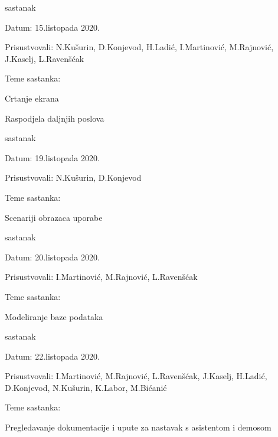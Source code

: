 \begin{packed_enum}
	\item sastanak
	\item[] \begin{packed_item}
		\item Datum: 15.listopada 2020.
		\item Prisustvovali: N.Kušurin, D.Konjevod, H.Ladić, I.Martinović, M.Rajnović, J.Kaselj, L.Ravenšćak
		\item Teme sastanka: 
		\begin{packed_item}
			\item   Crtanje ekrana
			\item 	Raspodjela daljnjih poslova
		\end{packed_item}
	\end{packed_item}

	\item sastanak
	\item[] \begin{packed_item}
		\item Datum:  19.listopada 2020.
		\item Prisustvovali: N.Kušurin, D.Konjevod
		\item Teme sastanka: 
		\begin{packed_item}
			\item   Scenariji obrazaca uporabe
		\end{packed_item}
	\end{packed_item}
	
	
	\item sastanak
	\item[] \begin{packed_item}
		\item Datum: 20.listopada 2020.
		\item Prisustvovali: I.Martinović, M.Rajnović, L.Ravenšćak
		\item Teme sastanka: 
		\begin{packed_item}
			\item   Modeliranje baze podataka
		\end{packed_item}
	\end{packed_item}
			
			
			\item sastanak
			\item[] \begin{packed_item}
				\item Datum: 22.listopada 2020.
				\item Prisustvovali: I.Martinović, M.Rajnović, L.Ravenšćak, J.Kaselj, H.Ladić, D.Konjevod, N.Kušurin, K.Labor, M.Bićanić
				\item Teme sastanka: 
				\begin{packed_item}
					\item   Pregledavanje dokumentacije i upute za nastavak s asistentom i demosom
				\end{packed_item}
			\end{packed_item}
			

\end{packed_enum}
